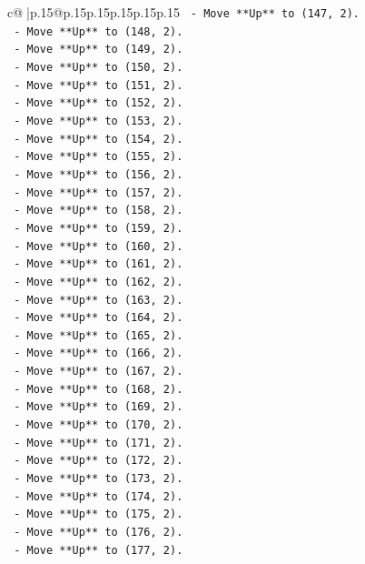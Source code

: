 \documentclass{article}
\begin{document}
{\begin{supertabular}{c@{$\;$}|p{.15\linewidth}@{}p{.15\linewidth}p{.15\linewidth}p{.15\linewidth}p{.15\linewidth}p{.15\linewidth}}
{{{\texttt{    {-} Move **Up** to (147, 2).} \\
\texttt{    {-} Move **Up** to (148, 2).} \\
\texttt{    {-} Move **Up** to (149, 2).} \\
\texttt{    {-} Move **Up** to (150, 2).} \\
\texttt{    {-} Move **Up** to (151, 2).} \\
\texttt{    {-} Move **Up** to (152, 2).} \\
\texttt{    {-} Move **Up** to (153, 2).} \\
\texttt{    {-} Move **Up** to (154, 2).} \\
\texttt{    {-} Move **Up** to (155, 2).} \\
\texttt{    {-} Move **Up** to (156, 2).} \\
\texttt{    {-} Move **Up** to (157, 2).} \\
\texttt{    {-} Move **Up** to (158, 2).} \\
\texttt{    {-} Move **Up** to (159, 2).} \\
\texttt{    {-} Move **Up** to (160, 2).} \\
\texttt{    {-} Move **Up** to (161, 2).} \\
\texttt{    {-} Move **Up** to (162, 2).} \\
\texttt{    {-} Move **Up** to (163, 2).} \\
\texttt{    {-} Move **Up** to (164, 2).} \\
\texttt{    {-} Move **Up** to (165, 2).} \\
\texttt{    {-} Move **Up** to (166, 2).} \\
\texttt{    {-} Move **Up** to (167, 2).} \\
\texttt{    {-} Move **Up** to (168, 2).} \\
\texttt{    {-} Move **Up** to (169, 2).} \\
\texttt{    {-} Move **Up** to (170, 2).} \\
\texttt{    {-} Move **Up** to (171, 2).} \\
\texttt{    {-} Move **Up** to (172, 2).} \\
\texttt{    {-} Move **Up** to (173, 2).} \\
\texttt{    {-} Move **Up** to (174, 2).} \\
\texttt{    {-} Move **Up** to (175, 2).} \\
\texttt{    {-} Move **Up** to (176, 2).} \\
\texttt{    {-} Move **Up** to (177, 2).} \\
}}}
\end{supertabular}}
\end{document}
